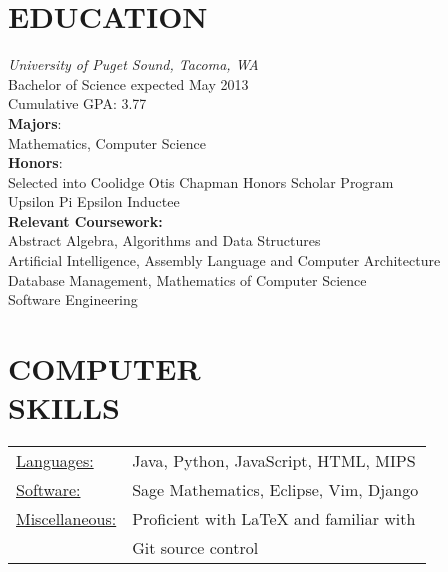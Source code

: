 \documentclass[line,margin,11pt]{res}
\begin{document}
\address{1311 N. Alder, Tacoma, WA 98406} 
\address{kwenholz@pugetsound.edu\hspace*{2mm} \vline \hspace*{2mm} (406)546-9210}

 
\begin{resume}
\vspace*{.3cm}

\section{EDUCATION} {\sl University of Puget Sound, Tacoma, WA} \\
                Bachelor of Science
                expected May 2013 \\
                Cumulative GPA: 3.77\\
                \textbf{Majors}: \\
\hspace*{5mm}                Mathematics, Computer Science \\
                \textbf{Honors}:\\
\hspace*{5mm}   Selected into Coolidge Otis Chapman Honors Scholar Program\\
\hspace*{5mm}   Upsilon Pi Epsilon Inductee\\
                \textbf{Relevant Coursework:}\\ 
\hspace*{5mm}                   Abstract Algebra, Algorithms and Data Structures\\
\hspace*{5mm}                   Artificial Intelligence, Assembly Language and Computer Architecture\\
\hspace*{5mm}                   Database Management, Mathematics of Computer Science\\
\hspace*{5mm}                   Software Engineering 
      
\vspace*{.2cm}

\section{COMPUTER \\ SKILLS}
\begin{tabular}{l l}
   \underline{Languages:} & Java, Python, JavaScript, HTML, MIPS\\
   \underline{Software:} & Sage Mathematics, Eclipse, Vim, Django\\
   \underline{Miscellaneous:} & Proficient with LaTeX and familiar with\\
        & Git source control
  \end{tabular}


\end{resume}
\end{document}
